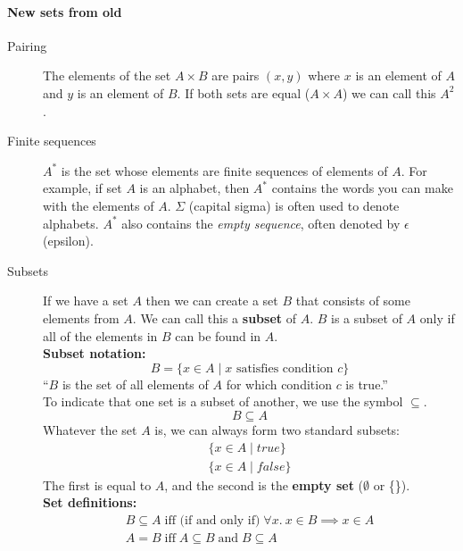 \documentclass{article}
\begin{document}
\paragraph{New sets from old}
\begin{description}
\item [Pairing] The elements of the set $A\times B$ are pairs $(x,y)$ where $x$ is an element of $A$ and $y$ is an element of $B$. If both sets are equal ($A\times A$) we can call this $A^2$.
\item [Finite sequences] $A^*$ is the set whose elements are finite sequences of elements of $A$. For example, if set $A$ is an alphabet, then $A^*$ contains the words you can make with the elements of $A$. $\Sigma$ (capital sigma) is often used to denote alphabets. $A^*$ also contains the \textit{empty sequence}, often denoted by $\epsilon$ (epsilon).
\item [Subsets] If we have a set $A$ then we can create a set $B$ that consists of some elements from $A$. We can call this a \textbf{subset} of $A$. $B$ is a subset of $A$ only if all of the elements in $B$ can be found in $A$.
\vspace{2mm}\\
\textbf{Subset notation:}
$$B=\{x\in A\; |\; x\text{ satisfies condition } c\}$$
``$B$ is the set of all elements of $A$ for which condition $c$ is true.''
\vspace{2mm}\\
To indicate that one set is a subset of another, we use the symbol $\subseteq$.
$$B\subseteq A$$
Whatever the set $A$ is, we can always form two standard subsets:
\begin{gather*}
\{x\in A\; |\; true\}\\
\{x\in A\; |\; false\}
\end{gather*}
The first is equal to $A$, and the second is the \textbf{empty set} ($\emptyset$ or \{\}).
\vspace{2mm}\\
\textbf{Set definitions:}
\begin{gather*}
B\subseteq A\; \text{iff (if and only if)}\; \forall x.\: x\in B\implies x\in A\\
A=B\; \text{iff}\; A\subseteq B\; \text{and}\; B\subseteq A
\end{gather*}
\end{description}
\end{document}
